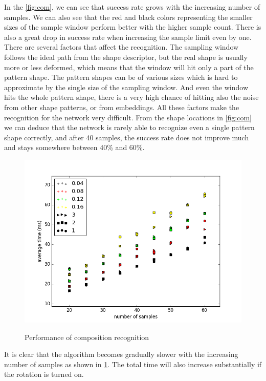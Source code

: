 In the \ref{fig:com}, we can see that success rate grows with the increasing number of samples. We can also see that the red and black colors representing the smaller sizes of the sample window perform better with the higher sample count. There is also a great drop in success rate when increasing the sample limit even by one. There are several factors that affect the recognition. The sampling window follows the ideal path from the shape descriptor, but the real shape is usually more or less deformed, which means that the window will hit only a part of the pattern shape. The pattern shapes can be of various sizes which is hard to approximate by the single size of the sampling window. And even the window hits the whole pattern shape, there is a very high chance of hitting also the noise from other shape patterns, or from embeddings. All these factors make the recognition for the network very difficult. From the shape locations in \ref{fig:com} we can deduce that the network is rarely able to recognize even a single pattern shape correctly, and after 40 samples, the success rate does not improve much and stays somewhere between 40\% and 60\%.

\begin{figure}[!htb]
\begin{center}
\label{fig:com_speed}
\includegraphics[width=\linewidth]{ext/figure_composition_speed.png}
\end{center}
    \centering
    \caption{Performance of composition recognition}
\end{figure}
It is clear that the algorithm becomes gradually slower with the increasing number of samples as shown in \ref{fig:com_speed}. The total time will also increase substantially if the rotation is turned on.

